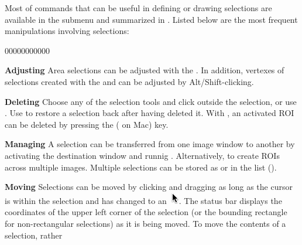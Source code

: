 Most of commands that can be useful in defining or drawing selections
are available in the \textsf{}
submenu and summarized in . Listed
below are the most frequent manipulations involving selections:
\begin{lyxlist}{00000000000}
\item [{\textbf{Adjusting}}] \noindent Area selections can be adjusted
with the . In addition, vertexes
of selections created with the 
and  can be adjusted by Alt/Shift-clicking.
\item [{\textbf{Deleting}}] \noindent Choose any of the selection tools
and click outside the selection, or use \textsf{}.
Use\textsf{ }
to restore a selection back after having deleted it. With ,
an activated ROI can be deleted by pressing the 
( on Mac) key.
\item [{\textbf{Managing}}] \noindent A selection can be transferred from
one image window to another by activating the destination window and
runnig \textsf{}.
Alternatively, \textsf{}
to create ROIs across multiple images. Multiple selections can be
stored as  or in the 
list (\textsf{}).
\item [{\textbf{Moving}}] \noindent Selections can be moved by clicking
and dragging as long as the cursor is within the selection and has
changed to an\ \includegraphics[scale=0.5]{images/pointers/Pointer-Arrow}.
The status bar displays the coordinates of the upper left corner of
the selection (or the bounding rectangle for non-rectangular selections)
as it is being moved. To move the contents of a selection, rather

\end{lyxlist}
